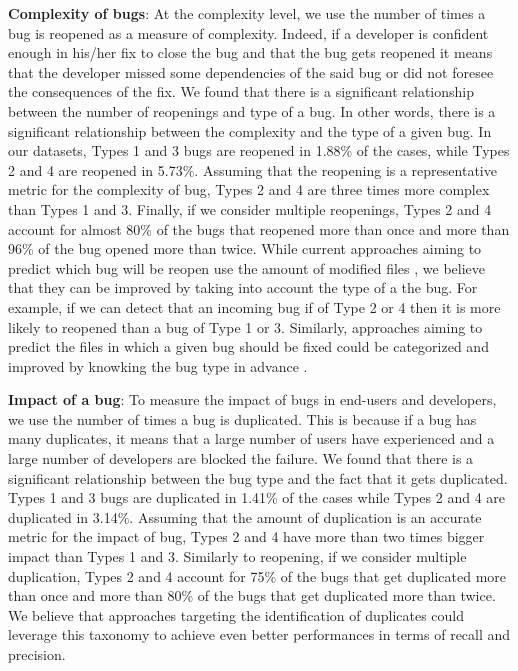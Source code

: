 {\bf Complexity of bugs}: At the complexity level, we use the
number of times a bug is reopened as a measure of
complexity. Indeed, if a developer is confident enough in
his/her fix to close the bug and that the bug gets reopened it
means that the developer missed some dependencies of the
said bug or did not foresee the consequences of the fix.
We found that there is a significant relationship between
the number of reopenings and type of a bug. In other words,
there is a significant relationship between the complexity and
the type of a given bug. In our datasets, Types 1 and 3 bugs
are reopened in 1.88\% of the cases, while Types 2 and 4 are
reopened in 5.73\%. Assuming that the reopening is a
representative metric for the complexity of bug, Types 2 and
4 are three times more complex than Types 1 and 3. Finally, if
we consider multiple reopenings, Types 2 and 4 account for
almost 80\% of the bugs that reopened more than once and
more than 96\% of the bug opened more than twice.
While current approaches aiming to predict which bug
will be reopen use the amount of modified files \cite{Shihab2010,Zimmermann2012,Lo2013}, we
believe that they can be improved by taking into account the type of a the bug. For example, if we can detect that an
incoming bug if of Type 2 or 4 then it is more likely to
reopened than a bug of Type 1 or 3. Similarly, approaches
aiming to predict the files in which a given bug should be
fixed could be categorized and improved by knowking the
bug type in advance \cite{Zhou2012,Kim2013a}.

{\bf Impact of a bug}: To measure the impact of bugs in end-users
and developers, we use the number of times a bug is
duplicated. This is because if a bug has many duplicates, it
means that a large number of users have experienced and a
large number of developers are blocked the failure.
We found that there is a significant relationship between
the bug type and the fact that it gets duplicated. Types 1 and 3
bugs are duplicated in 1.41\% of the cases while Types 2 and 4
are duplicated in 3.14\%. Assuming that the amount of
duplication is an accurate metric for the impact of bug, Types
2 and 4 have more than two times bigger impact than Types 1
and 3. Similarly to reopening, if we consider multiple
duplication, Types 2 and 4 account for 75\% of the bugs that
get duplicated more than once and more than 80\% of the bugs
that get duplicated more than twice.
We believe that approaches targeting the identification of
duplicates \cite{Bettenburg2008a,Jalbert2008,Sun2010,Tian2012a}  could leverage this taxonomy to
achieve even better performances in terms of recall and
precision.

